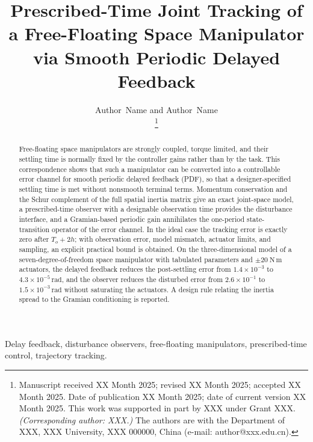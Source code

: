 \documentclass[journal]{IEEEtran}
\title{Prescribed-Time Joint Tracking of a Free-Floating Space Manipulator via Smooth Periodic Delayed Feedback}
\author{Author~Name and Author~Name\\
\thanks{Manuscript received XX Month 2025; revised XX Month 2025; accepted XX Month 2025. Date of publication XX Month 2025; date of current version XX Month 2025. This work was supported in part by XXX under Grant XXX. \emph{(Corresponding author: XXX.)}
The authors are with the Department of XXX, XXX University, XXX 000000, China (e-mail: author@xxx.edu.cn).}}
\theoremstyle{definition}
\theoremstyle{plain}
\theoremstyle{remark}
\begin{document}
\maketitle

\begin{abstract}
Free-floating space manipulators are strongly coupled, torque limited, and their settling time is normally fixed by the controller gains rather than by the task. This correspondence shows that such a manipulator can be converted into a controllable error channel for smooth periodic delayed feedback (PDF), so that a designer-specified settling time is met without nonsmooth terminal terms. Momentum conservation and the Schur complement of the full spatial inertia matrix give an exact joint-space model, a prescribed-time observer with a designable observation time provides the disturbance interface, and a Gramian-based periodic gain annihilates the one-period state-transition operator of the error channel. In the ideal case the tracking error is exactly zero after $T_o+2h$; with observation error, model mismatch, actuator limits, and sampling, an explicit practical bound is obtained. On the three-dimensional model of a seven-degree-of-freedom space manipulator with tabulated parameters and $\pm20~\mathrm{N\,m}$ actuators, the delayed feedback reduces the post-settling error from $1.4\times10^{-3}$ to $4.3\times10^{-5}\,\mathrm{rad}$, and the observer reduces the disturbed error from $2.6\times10^{-1}$ to $1.5\times10^{-3}\,\mathrm{rad}$ without saturating the actuators. A design rule relating the inertia spread to the Gramian conditioning is reported.
\end{abstract}

\begin{IEEEkeywords}
Delay feedback, disturbance observers, free-floating manipulators, prescribed-time control, trajectory tracking.
\end{IEEEkeywords}








\appendices





% 
\end{document}
